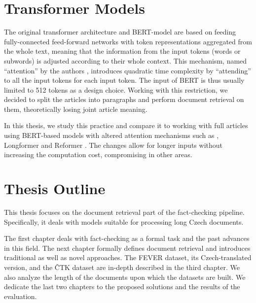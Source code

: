 \section*{Transformer Models}

The original transformer architecture \citep{attention-is-all-you-need} and BERT-model \citep{bert} are based on feeding fully-connected feed-forward networks with token representations aggregated from the whole text, meaning that the information from the input tokens (words or subwords) is adjusted according to their whole context. 
This mechanism, named ``attention'' by the authors \citep{first-attention}, introduces quadratic time complexity by ``attending'' to all the input tokens for each input token.
The input of BERT is thus usually limited to 512 tokens as a design choice.
Working with this restriction, we decided to split the \CTK{} articles into paragraphs and perform document retrieval on them, theoretically losing joint article meaning.

In this thesis, we study this practice and compare it to working with full articles using BERT-based models with altered attention mechanisms such as \nystr{} \citep{nystrom}, Longformer \citep{longformer} and Reformer \citep{reformer}.
The changes allow for longer inputs without increasing the computation cost, compromising in other areas.

\section*{Thesis Outline}

This thesis focuses on the document retrieval part of the fact-checking pipeline.
Specifically, it deals with models suitable for processing long Czech documents.

The first chapter deals with fact-checking as a formal task and the past advances in this field.
The next chapter formally defines document retrieval and introduces traditional as well as novel approaches. 
The FEVER dataset, its Czech-translated version, and the ČTK dataset are in-depth described in the third chapter.
We also analyze the length of the documents upon which the datasets are built.
We dedicate the last two chapters to the proposed solutions and the results of the evaluation.